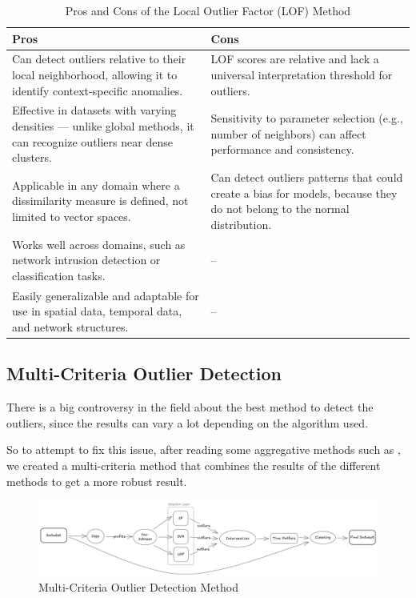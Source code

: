 \documentclass[11pt,english,a4paper,hidelinks]{book}
\begin{document}
\begin{table}[H]
    \centering
    \begin{tabular}{|p{7cm}|p{7cm}|}
    \hline
    \textbf{Pros} & \textbf{Cons} \\
    \hline
    Can detect outliers relative to their local neighborhood, allowing it to identify context-specific anomalies. & LOF scores are relative and lack a universal interpretation threshold for outliers. \\
    \hline
    Effective in datasets with varying densities — unlike global methods, it can recognize outliers near dense clusters. & Sensitivity to parameter selection (e.g., number of neighbors) can affect performance and consistency. \\
    \hline
    Applicable in any domain where a dissimilarity measure is defined, not limited to vector spaces. & Can detect outliers patterns that could create a bias for models, because they do not belong to the normal distribution. \\
    \hline
    Works well across domains, such as network intrusion detection or classification tasks. & -- \\
    \hline
    Easily generalizable and adaptable for use in spatial data, temporal data, and network structures. & -- \\
    \hline
    \end{tabular}
    \caption{Pros and Cons of the Local Outlier Factor (LOF) Method}
\end{table}
    
\subsection{Multi-Criteria Outlier Detection}

There is a big controversy in the field about the best method to detect the outliers, since the results can vary a lot depending on the algorithm used.

\vspace{0.5cm}
\noindent So to attempt to fix this issue, after reading some aggregative methods such as \textcite{abro2020stacking}, we created a multi-criteria method that combines the results of the different methods to get a more robust result.

\begin{figure}[H]
    \centering
    \includegraphics[width=1\textwidth]{images/code/outliers/multimodal.png}
    \caption{Multi-Criteria Outlier Detection Method}
    \label{fig:multimodal}
\end{figure}
\end{document}
